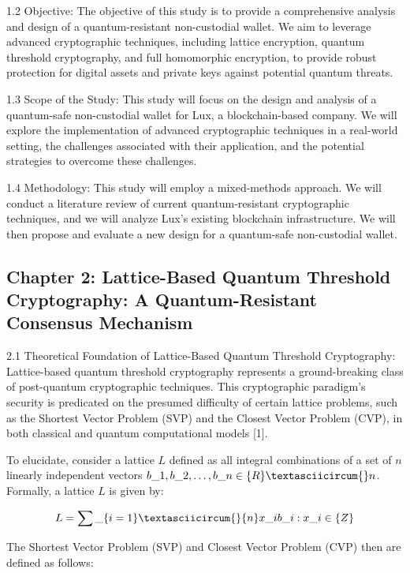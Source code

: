 \documentclass[11pt]{article}
\begin{document}
1.2 Objective: The objective of this study is to provide a comprehensive analysis and design of a quantum-resistant non-custodial wallet. We aim to leverage advanced cryptographic techniques, including lattice encryption, quantum threshold cryptography, and full homomorphic encryption, to provide robust protection for digital assets and private keys against potential quantum threats.


1.3 Scope of the Study: This study will focus on the design and analysis of a quantum-safe non-custodial wallet for Lux, a blockchain-based company. We will explore the implementation of advanced cryptographic techniques in a real-world setting, the challenges associated with their application, and the potential strategies to overcome these challenges.


1.4 Methodology: This study will employ a mixed-methods approach. We will conduct a literature review of current quantum-resistant cryptographic techniques, and we will analyze Lux's existing blockchain infrastructure. We will then propose and evaluate a new design for a quantum-safe non-custodial wallet.


\subsection{Chapter 2: Lattice-Based Quantum Threshold Cryptography: A Quantum-Resistant Consensus Mechanism}

2.1 Theoretical Foundation of Lattice-Based Quantum Threshold Cryptography: Lattice-based quantum threshold cryptography represents a ground-breaking class of post-quantum cryptographic techniques. This cryptographic paradigm's security is predicated on the presumed difficulty of certain lattice problems, such as the Shortest Vector Problem (SVP) and the Closest Vector Problem (CVP), in both classical and quantum computational models [1].


To elucidate, consider a lattice \(L\) defined as all integral combinations of a set of \(n\) linearly independent vectors \(b\_1, b\_2, \ldots, b\_n \in \mathbb\{R\}\textasciicircum{}n\). Formally, a lattice \(L\) is given by:


\[L = \\{ \sum\_\{i=1\}\textasciicircum{}\{n\} x\_ib\_i : x\_i \in \mathbb\{Z\} \\}\]


The Shortest Vector Problem (SVP) and Closest Vector Problem (CVP) then are defined as follows:
\end{document}
